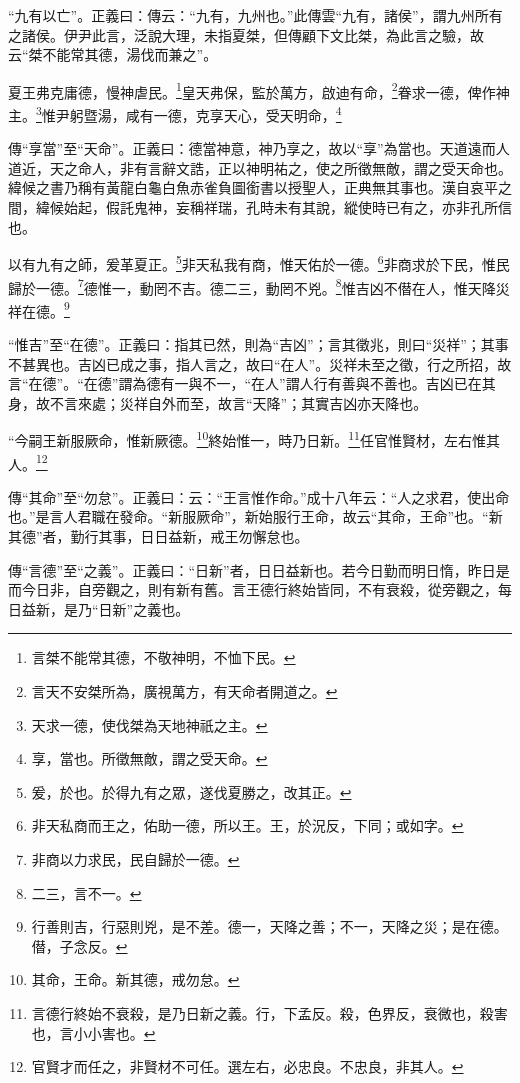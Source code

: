 {\noindent\shu{}\fzkt “九有以亡”。正義曰：傳云：“九有，九州也。”此傳雲“九有，諸侯”，謂九州所有之諸侯。伊尹此言，泛說大理，未指夏桀，但傳顧下文比桀，為此言之驗，故云“桀不能常其德，湯伐而兼之”。 \par}

夏王弗克庸德，慢神虐民。\footnote{言桀不能常其德，不敬神明，不恤下民。}皇天弗保，監於萬方，啟迪有命，\footnote{言天不安桀所為，廣視萬方，有天命者開道之。}眷求一德，俾作神主。\footnote{天求一德，使伐桀為天地神祇之主。}惟尹躬暨湯，咸有一德，克享天心，受天明命，\footnote{享，當也。所徵無敵，謂之受天命。}

{\noindent\zhuan{}\fzbyks 傳“享當”至“天命”。正義曰：德當神意，神乃享之，故以“享”為當也。天道遠而人道近，天之命人，非有言辭文誥，正以神明祐之，使之所徵無敵，謂之受天命也。緯候之書乃稱有黃龍白龜白魚赤雀負圖銜書以授聖人，正典無其事也。漢自哀平之間，緯候始起，假託鬼神，妄稱祥瑞，孔時未有其說，縱使時已有之，亦非孔所信也。 \par}

以有九有之師，爰革夏正。\footnote{爰，於也。於得九有之眾，遂伐夏勝之，改其正。}非天私我有商，惟天佑於一德。\footnote{非天私商而王之，佑助一德，所以王。王，於況反，下同；或如字。}非商求於下民，惟民歸於一德。\footnote{非商以力求民，民自歸於一德。}德惟一，動罔不吉。德二三，動罔不兇。\footnote{二三，言不一。}惟吉凶不僣在人，惟天降災祥在德。\footnote{行善則吉，行惡則兇，是不差。德一，天降之善；不一，天降之災；是在德。僣，子念反。}

{\noindent\shu{}\fzkt “惟吉”至“在德”。正義曰：指其已然，則為“吉凶”；言其徵兆，則曰“災祥”；其事不甚異也。吉凶已成之事，指人言之，故曰“在人”。災祥未至之徵，行之所招，故言“在德”。“在德”謂為德有一與不一，“在人”謂人行有善與不善也。吉凶已在其身，故不言來處；災祥自外而至，故言“天降”；其實吉凶亦天降也。 \par}

“今嗣王新服厥命，惟新厥德。\footnote{其命，王命。新其德，戒勿怠。}終始惟一，時乃日新。\footnote{言德行終始不衰殺，是乃日新之義。行，下孟反。殺，色界反，衰微也，殺害也，言小小害也。}任官惟賢材，左右惟其人。\footnote{官賢才而任之，非賢材不可任。選左右，必忠良。不忠良，非其人。}


{\noindent\zhuan{}\fzbyks 傳“其命”至“勿怠”。正義曰：云：“王言惟作命。”成十八年云：“人之求君，使出命也。”是言人君職在發命。“新服厥命”，新始服行王命，故云“其命，王命”也。“新其德”者，勤行其事，日日益新，戒王勿懈怠也。 \par}

{\noindent\zhuan{}\fzbyks 傳“言德”至“之義”。正義曰：“日新”者，日日益新也。若今日勤而明日惰，昨日是而今日非，自旁觀之，則有新有舊。言王德行終始皆同，不有衰殺，從旁觀之，每日益新，是乃“日新”之義也。 \par}

